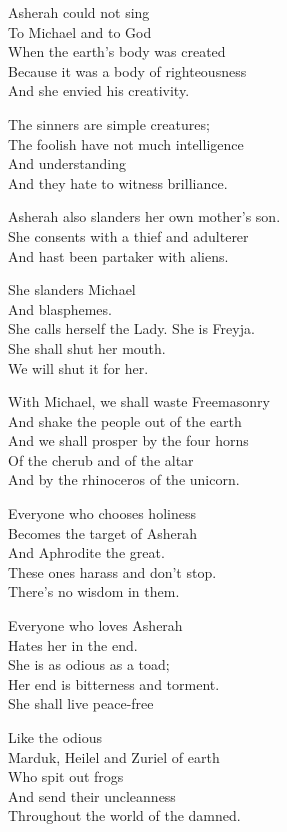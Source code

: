 \documentclass[
]{book}
\begin{document}
Asherah could not sing\\
To Michael and to God\\
When the earth's body was created\\
Because it was a body of righteousness\\
And she envied his creativity.

The sinners are simple creatures;\\
The foolish have not much intelligence\\
And understanding\\
And they hate to witness brilliance.

Asherah also slanders her own mother's son.\\
She consents with a thief and adulterer\\
And hast been partaker with aliens.

She slanders Michael\\
And blasphemes.\\
She calls herself the Lady. She is Freyja.\\
She shall shut her mouth.\\
We will shut it for her.

With Michael, we shall waste Freemasonry\\
And shake the people out of the earth\\
And we shall prosper by the four horns\\
Of the cherub and of the altar\\
And by the rhinoceros of the unicorn.

Everyone who chooses holiness\\
Becomes the target of Asherah\\
And Aphrodite the great.\\
These ones harass and don't stop.\\
There's no wisdom in them.

Everyone who loves Asherah\\
Hates her in the end.\\
She is as odious as a toad;\\
Her end is bitterness and torment.\\
She shall live peace-free

Like the odious\\
Marduk, Heilel and Zuriel of earth\\
Who spit out frogs\\
And send their uncleanness\\
Throughout the world of the damned.
\end{document}
